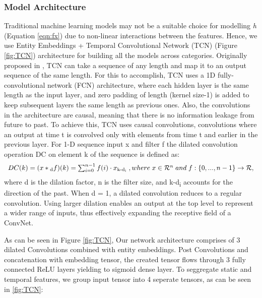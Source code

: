 \subsubsection{Model Architecture}
Traditional machine learning models may not be a suitable choice for modelling \emph{h} (Equation \ref{eqn:fx}) due to 
non-linear interactions between the features. Hence, we use Entity Embeddings + Temporal Convolutional Network (TCN) 
(Figure \ref{fig:TCN}) architecture for building all the models 
across categories. Originally proposed in \cite{lea2016temporal}, TCN can take a sequence of any length and map it to an 
output sequence of the same length. For this to accomplish, TCN uses a 1D fully-convolutional network (FCN) architecture, 
where each hidden layer is the same length as the input layer, and zero padding of length (kernel size-1) is added to 
keep subsequent layers the same length as previous ones. Also, the convolutions in the architecture are causal, 
meaning that there is no information leakage from future to past. To achieve this, TCN uses causal convolutions, 
convolutions where an output at time t is convolved only with elements from time t and earlier in the previous layer.
For 1-D sequence input x and filter f the dilated convolution operation DC on element k of the sequence is defined as:
  \begin{equation}
      \begin{array}{l}
        DC(k) = (x\ast \textsubscript{d}f)(k) =  \sum_{i=0}^{n-1}f(i)\cdot x\textsubscript{k-d\textsubscript{i}}
        \;, where \;
        x \in \mathcal{R}^n \;and\;
        f : \{0, . . . , n-1\} \to \mathcal{R},
      \end{array}
    \label{eqn:logloss}
  \end{equation}
where d is the dilation factor, n is the filter size, and k-d\textsubscript{i}
accounts for the direction of the past. When d = 1, a dilated convolution reduces to a
regular convolution. Using larger dilation enables an output
at the top level to represent a wider range of inputs, thus
effectively expanding the receptive field of a ConvNet.

As can be seen in Figure \ref{fig:TCN}, Our network architecture comprises of 3 dilated Convolutions combined with 
entity embeddings. Post Convolutions and concatenation with embedding tensor, the created tensor flows through 
3 fully connected ReLU layers yielding to sigmoid dense layer. To seggregate static and temporal
features, we group input tensor into 4 seperate tensors, as can be seen in \ref{fig:TCN}:

